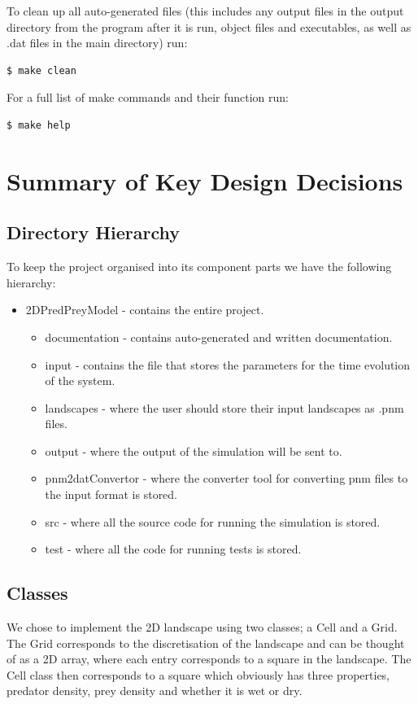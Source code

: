 To clean up all auto-generated files (this includes any output files in the output directory from the program after it is run, object files and executables, as well as .dat files in the main directory) run:
\begin{lstlisting}[language=bash]
$ make clean
\end{lstlisting}


For a full list of make commands and their function run:
\begin{lstlisting}[language=bash]
$ make help
\end{lstlisting}


\section{Summary of Key Design Decisions}
\subsection{Directory Hierarchy}
To keep the project organised into its component parts we have the following hierarchy: 
\begin{itemize}
\item 2DPredPreyModel  - contains the entire project.
\begin{itemize}
\item documentation    - contains auto-generated and written documentation.
\item input            - contains the file that stores the parameters for the time evolution of the system.
\item landscapes       - where the user should store their input landscapes as .pnm files.
\item output           - where the output of the simulation will be sent to.
\item pnm2datConvertor - where the converter tool for converting pnm files to the input format is stored.
\item src              - where all the source code for running the simulation is stored. 
\item test             - where all the code for running tests is stored. 
\end{itemize}
\end{itemize}
\subsection{Classes}
We chose to implement the 2D landscape using two classes; a Cell and a Grid. The Grid corresponds to the discretisation of the landscape and can be thought of as a 2D array, where each entry corresponds to a square in the landscape. The Cell class then corresponds to a square which obviously has three properties, predator density, prey density and whether it is wet or dry.
